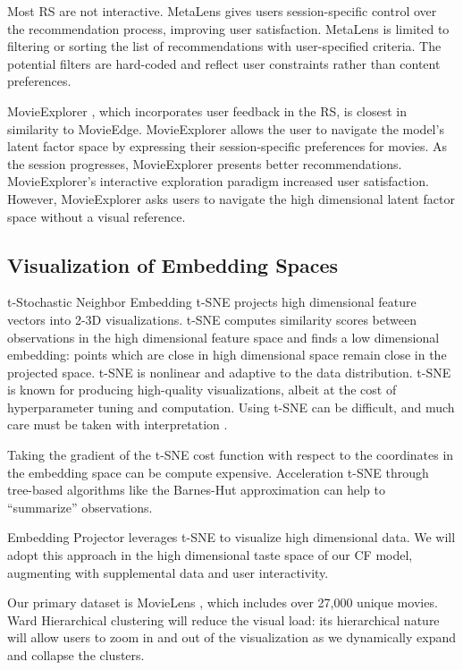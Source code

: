 Most RS are not interactive. MetaLens \cite{schafer2002meta}gives users session-specific control over the recommendation process, improving user satisfaction. MetaLens is limited to filtering or sorting the list of recommendations with user-specified criteria. The potential filters are hard-coded and reflect user constraints rather than content preferences. 

MovieExplorer \cite{taijala2018movieexplorer}, which incorporates user feedback in the RS, is closest in similarity to MovieEdge. MovieExplorer allows the user to navigate the model's latent factor space by expressing their session-specific preferences for movies.  As the session progresses, MovieExplorer presents better recommendations. MovieExplorer’s interactive exploration paradigm increased user satisfaction. However, MovieExplorer asks users to navigate the high dimensional latent factor space without a visual reference. 

\subsection{Visualization of Embedding Spaces}

t-Stochastic Neighbor Embedding \mbox{t-SNE} \cite{maaten2008visualizing} projects high dimensional feature vectors into 2-3D visualizations. \mbox{t-SNE} computes similarity scores between observations in the high dimensional feature space and finds a low dimensional embedding: points which are close in high dimensional space remain close in the projected space. \mbox{t-SNE} is nonlinear and adaptive to the data distribution. \mbox{t-SNE} is known for producing high-quality visualizations, albeit at the cost of hyperparameter tuning and computation. Using \mbox{t-SNE} can be difficult, and much care must be taken with interpretation \cite{wattenberg2016how}.

Taking the gradient of the \mbox{t-SNE} cost function with respect to the coordinates in the embedding space can be compute expensive.  Acceleration \mbox{t-SNE} through tree-based algorithms like the Barnes-Hut approximation \cite{van2014accelerating} can help to “summarize” observations.  

Embedding Projector \cite{smilkov2016embedding} leverages \mbox{t-SNE} to visualize high dimensional data. We will adopt this approach in the high dimensional taste space of our CF model, augmenting with supplemental data and user interactivity. 

Our primary dataset is MovieLens \cite{harper2016movielens}, which includes over 27,000 unique movies. Ward Hierarchical clustering \cite{ward1963hierarchical} will reduce the visual load:  its hierarchical nature will allow users to zoom in and out of the visualization as we dynamically expand and collapse the clusters.


